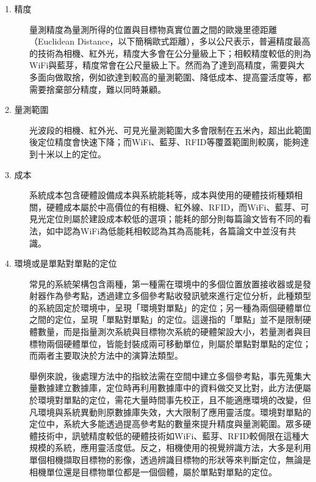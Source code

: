 \begin{description}
    \item[1. 精度]\hfill 
    
    \qquad
    量測精度為量測所得的位置與目標物真實位置之間的歐幾里德距離（Euclidean Distance，以下簡稱歐式距離），多以公尺表示\cite{survey:indoor_wayfinding}，普遍精度最高的技術為相機、紅外光\cite{survey_indoor2014}，精度大多會在公分量級上下；相較精度較低的則為WiFi與藍芽，精度常會在公尺量級上下\cite{survey_indoor2014}。然而為了達到高精度，需要與大多面向做取捨\cite{survey:indoor_wayfinding}，例如欲達到較高的量測範圍、降低成本、提高靈活度等，都需要捨棄部分精度，難以同時兼顧。
    
    \item[2. 量測範圍] \hfill  
    
    \qquad
    光波段的相機、紅外光、可見光量測範圍大多會限制在五米內，超出此範圍後定位精度會快速下降；而WiFi、藍芽、RFID等覆蓋範圍則較廣，能夠達到十米以上的定位\cite{survey_indoor2014}。
    
    \item[3. 成本] \hfill 
    
    \qquad
    系統成本包含硬體設備成本與系統能耗等，成本與使用的硬體技術種類相關，硬體成本屬於中高價位的有相機、紅外線、RFID，而WiFi、藍芽、可見光定位則屬於建設成本較低的選項；能耗的部分則每篇論文皆有不同的看法，如\cite{survey:radio}中認為WiFi為低能耗相較\cite{survey:indoor_wayfinding}認為其為高能耗，各篇論文中並沒有共識。
    
    \item[4. 環境或是單點對單點的定位] \hfill 
    
    \qquad
    常見的系統架構包含兩種，第一種需在環境中的多個位置放置接收器或是發射器作為參考點，透過建立多個參考點收發訊號來進行定位分析，此種類型的系統固定於環境中，呈現「環境對單點」的定位；另一種為兩個硬體單位之間的定位，呈現「單點對單點」的定位。這邊指的「單點」並不是限制硬體數量，而是指量測次系統與目標物次系統的硬體架設大小，若量測者與目標物兩個硬體單位，皆能封裝成兩可移動單位，則屬於單點對單點的定位；而兩者主要取決於方法中的演算法類型。

    \qquad
    舉例來說，後處理方法中的指紋法需在空間中建立多個參考點，事先蒐集大量數據建立數據庫，定位時再利用數據庫中的資料做交叉比對，此方法便屬於環境對單點的定位，需花大量時間事先校正，且不能適應環境的改變，但凡環境與系統異動則原數據庫失效，大大限制了應用靈活度。環境對單點的定位中，系統大多能透過提高參考點的數量來提升精度與量測範圍。眾多硬體技術中，訊號精度較低的硬體技術如WiFi、藍芽、RFID較侷限在這種大規模的系統，應用靈活度低。反之，相機使用的視覺辨識方法，大多是利用單個相機擷取目標物的影像，透過辨識目標物的形狀等來判斷定位，無論是相機單位還是目標物單位都是一個個體，屬於單點對單點的定位。


\end{description}
